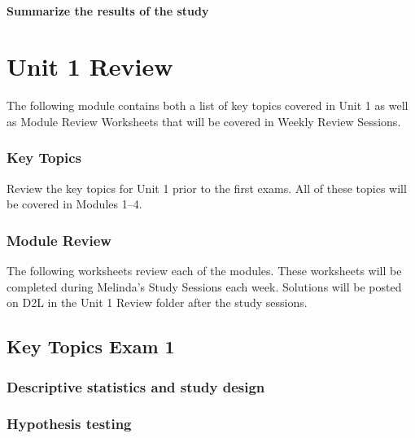 \documentclass[
]{report}
\begin{document}
\subsubsection*{Summarize the results of the study}\label{summarize-the-results-of-the-study}

\chapter{Unit 1 Review}\label{unit-1-review}

The following module contains both a list of key topics covered in Unit 1 as well as Module Review Worksheets that will be covered in Weekly Review Sessions.

\subsection{Key Topics}\label{key-topics-4}

Review the key topics for Unit 1 prior to the first exams. All of these topics will be covered in Modules 1--4.

\subsection{Module Review}\label{module-review}


The following worksheets review each of the modules. These worksheets will be completed during Melinda's Study Sessions each week. Solutions will be posted on D2L in the Unit 1 Review folder after the study sessions.

\newpage

\section{Key Topics Exam 1}\label{key-topics-exam-1}

\subsection*{Descriptive statistics and study design}\label{descriptive-statistics-and-study-design}

\subsection*{Hypothesis testing}\label{hypothesis-testing-1}
\end{document}
